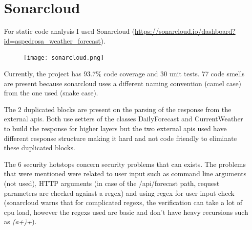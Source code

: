 \documentclass[12pt]{article}
\begin{document}
\section{Sonarcloud}


For static code analysis I used Sonarcloud (\url{https://sonarcloud.io/dashboard?id=aspedrosa\_weather\_forecast}).

\begin{figure}[h]
  \center
  \texttt{[image: sonarcloud.png]}
\end{figure}

Currently, the project has 93.7\% code coverage and 30 unit tests. 77 code smells
  are present because sonarcloud uses a different naming convention (camel case) from the one used
  (snake case).

The 2 duplicated blocks are present on the parsing of the response from
  the external apis. Both use setters of the classes DailyForecast and CurrentWeather
  to build the response for higher layers but the two external apis used have different
  response structure making it hard and not code friendly to eliminate these duplicated
  blocks.

The 6 security hotstops concern security problems that can exists. The problems that
  were mentioned were related to user input such as command line arguments (not used), HTTP arguments
  (in case of the /api/forecast path, request parameters are checked against a regex) and
  using regex for user input check (sonarcloud warns that for complicated regexs, the verification can
  take a lot of cpu load, however the regexs used are basic and don't have heavy recursions such
  as \textit{(a+)+}).
\end{document}
